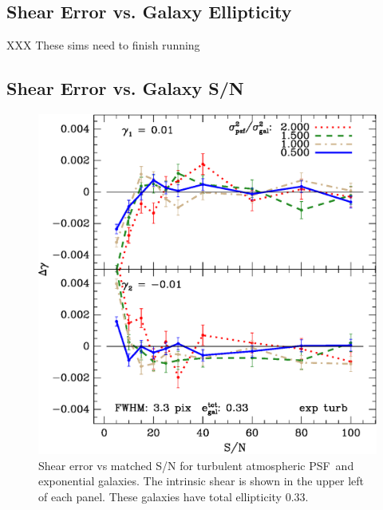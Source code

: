 \documentclass[10pt,preprint]{aastex}
\newcommand{\psf}{PSF}
\begin{document}
\subsection{Shear Error vs. Galaxy Ellipticity}


XXX These sims need to finish running



\subsection{Shear Error vs. Galaxy S/N}

\begin{figure}[t] \centering \centering
\includegraphics[scale=0.7]{figures/gmix-fit-et04r02-yr-0.005-0.005-diff.eps}

 \caption{Shear error vs matched S/N for turbulent atmospheric \psf\
 and exponential galaxies. The intrinsic shear is shown in the upper left of
 each panel.  These galaxies have total ellipticity 0.33.
 \label{fig:et04r02}}

\end{figure}
\end{document}
